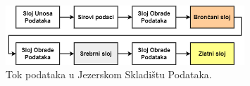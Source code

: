 \begin{figure}
    \centering
    \includegraphics[width=0.8\textwidth]{images/tok_podataka.drawio.png}
    \caption{Tok podataka u Jezerskom Skladištu Podataka.}
    \label{figure:datalakehouse_data_flow}
\end{figure}
